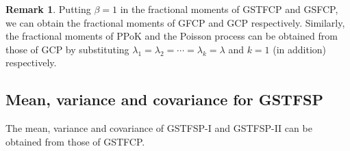 \documentclass[11pt,oneside,reqno]{amsart}
\theoremstyle{definition}
\newtheorem{remark}{\bf Remark}[section]
\theoremstyle{remarkstyle}
\begin{document}
\begin{remark}
Putting $\beta=1$ in the fractional moments of GSTFCP and GSFCP, we can obtain the fractional moments of GFCP and GCP respectively. Similarly, the fractional moments of PPoK and the Poisson process can be obtained from those of GCP by substituting $\lambda_1=\lambda_2=\cdots=\lambda_k=\lambda$ and $k=1$ (in addition) respectively. 
\end{remark}

 \subsection{Mean, variance and covariance for GSTFSP}\label{moments_GSTFSP}
 The mean, variance and covariance of GSTFSP-I and GSTFSP-II can be obtained from those of GSTFCP.
\end{document}
